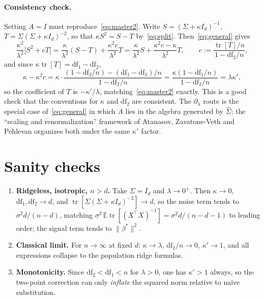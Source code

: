 \documentclass[11pt]{article}
\newcommand{\E}{\mathbb{E}}
\newcommand{\Tr}{\operatorname{tr}}
\newcommand{\Sig}{\Sigma}
\newcommand{\Sighat}{\hat{\Sigma}}
\newcommand{\bstar}{\beta^{*}}
\newcommand{\Id}{I_{d}}
\newcommand{\dfone}{\mathrm{df}_{1}}
\newcommand{\dftwo}{\mathrm{df}_{2}}
\newcommand{\kap}{\kappa}
\newcommand{\kapp}{\kappa'}
\newcommand{\Sk}{(\Sig+\kap \Id)}
\theoremstyle{plain}
\theoremstyle{remark}
\begin{document}
\paragraph{Consistency check.}
Setting $A = I$ must reproduce~\eqref{eq:master2}. Write $S = \Sk^{-1}$, $T = \Sig \Sk^{-2}$, so that
$\kap S^{2} = S - T$ by~\eqref{eq:split}. Then~\eqref{eq:general} gives
\begin{equation}
  \frac{\kap^{2}}{\lambda^{2}}\big[ S^{2} + cT \big]
  = \frac{\kap}{\lambda^{2}}(S - T) + \frac{\kap^{2}c}{\lambda^{2}} T
  = \frac{\kap}{\lambda^{2}} S + \frac{\kap^{2}c - \kap}{\lambda^{2}} T,
  \qquad c := \frac{ \Tr[T]/n }{1 - \dftwo/n},
\end{equation}
and since $\kap \Tr[T] = \dfone - \dftwo$,
\begin{equation}
  \kap - \kap^{2} c
  = \kap \cdot \frac{ (1 - \dftwo/n) - (\dfone - \dftwo)/n }{ 1 - \dftwo/n }
  = \frac{\kap(1 - \dfone/n)}{1 - \dftwo/n}
  = \lambda \kapp,
\end{equation}
so the coefficient of $T$ is $-\kapp/\lambda$, matching~\eqref{eq:master2} exactly. This is a good check
that the conventions for $\kap$ and $\dftwo$ are consistent. The $\partial_{\lambda}$ route is the
special case of~\eqref{eq:general} in which $A$ lies in the algebra generated by $\Sighat$; the
``scaling and renormalization'' framework of Atanasov, Zavatone-Veth and Pehlevan organizes both
under the same $\kapp$ factor.

\section{Sanity checks}

\begin{enumerate}
  \item \textbf{Ridgeless, isotropic, $n > d$.} Take $\Sig = \Id$ and $\lambda \to 0^{+}$. Then
  $\kap \to 0$, $\dfone, \dftwo \to d$, and $\Tr[\Sig\Sk^{-2}] \to d$, so the noise term tends to
  $\sigma^{2} d/(n - d)$, matching
  $\sigma^{2}\,\E\Tr[(X^{\top}X)^{-1}] = \sigma^{2} d/(n - d - 1)$ to leading order; the signal term
  tends to $\|\bstar\|^{2}$.

  \item \textbf{Classical limit.} For $n \to \infty$ at fixed $d$: $\kap \to \lambda$,
  $\dftwo/n \to 0$, $\kapp \to 1$, and all expressions collapse to the population ridge formulas.

  \item \textbf{Monotonicity.} Since $\dftwo < \dfone < n$ for $\lambda > 0$, one has $\kapp > 1$
  always, so the two-point correction can only \emph{inflate} the squared norm relative to naive
  substitution.
\end{enumerate}
\end{document}
